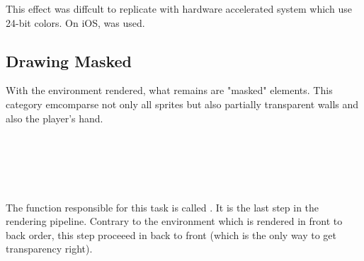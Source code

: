 \par
This effect was diffcult to replicate with hardware accelerated system which use 24-bit colors. On iOS,  was used.\\
\par
{} 














\subsection{Drawing Masked}
With the environment rendered, what remains are "masked" elements. This category emcomparse not only all sprites but also partially transparent walls and also the player's hand.\\
 \par


\\

\\

\\

\\
\pagebreak


The function responsible for this task is called . It is the last step in the rendering pipeline. Contrary to the environment which is rendered in front to back order, this step proceeed in back to front (which is the only way to get transparency right).\\
\par
\vspace{2mm}
\\

